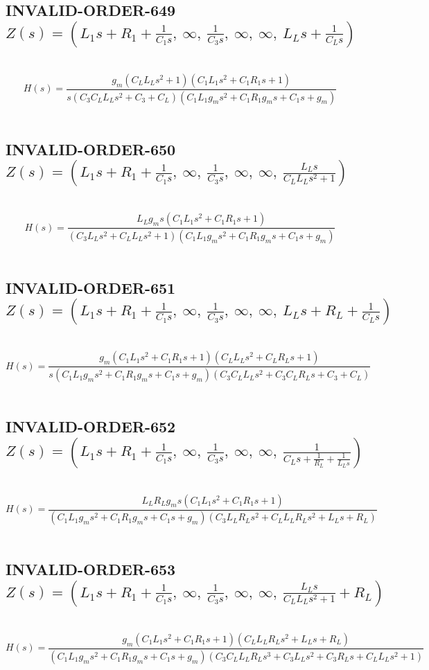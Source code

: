 \documentclass{article}
\begin{document}
\subsection{INVALID-ORDER-649 $Z(s) = \left( L_{1} s + R_{1} + \frac{1}{C_{1} s}, \  \infty, \  \frac{1}{C_{3} s}, \  \infty, \  \infty, \  L_{L} s + \frac{1}{C_{L} s}\right)$ } \ 
\textbf{\[H(s) = \frac{g_{m} \left(C_{L} L_{L} s^{2} + 1\right) \left(C_{1} L_{1} s^{2} + C_{1} R_{1} s + 1\right)}{s \left(C_{3} C_{L} L_{L} s^{2} + C_{3} + C_{L}\right) \left(C_{1} L_{1} g_{m} s^{2} + C_{1} R_{1} g_{m} s + C_{1} s + g_{m}\right)}\] } \ 
\subsection{INVALID-ORDER-650 $Z(s) = \left( L_{1} s + R_{1} + \frac{1}{C_{1} s}, \  \infty, \  \frac{1}{C_{3} s}, \  \infty, \  \infty, \  \frac{L_{L} s}{C_{L} L_{L} s^{2} + 1}\right)$ } \ 
\textbf{\[H(s) = \frac{L_{L} g_{m} s \left(C_{1} L_{1} s^{2} + C_{1} R_{1} s + 1\right)}{\left(C_{3} L_{L} s^{2} + C_{L} L_{L} s^{2} + 1\right) \left(C_{1} L_{1} g_{m} s^{2} + C_{1} R_{1} g_{m} s + C_{1} s + g_{m}\right)}\] } \ 
\subsection{INVALID-ORDER-651 $Z(s) = \left( L_{1} s + R_{1} + \frac{1}{C_{1} s}, \  \infty, \  \frac{1}{C_{3} s}, \  \infty, \  \infty, \  L_{L} s + R_{L} + \frac{1}{C_{L} s}\right)$ } \ 
\textbf{\[H(s) = \frac{g_{m} \left(C_{1} L_{1} s^{2} + C_{1} R_{1} s + 1\right) \left(C_{L} L_{L} s^{2} + C_{L} R_{L} s + 1\right)}{s \left(C_{1} L_{1} g_{m} s^{2} + C_{1} R_{1} g_{m} s + C_{1} s + g_{m}\right) \left(C_{3} C_{L} L_{L} s^{2} + C_{3} C_{L} R_{L} s + C_{3} + C_{L}\right)}\] } \ 
\subsection{INVALID-ORDER-652 $Z(s) = \left( L_{1} s + R_{1} + \frac{1}{C_{1} s}, \  \infty, \  \frac{1}{C_{3} s}, \  \infty, \  \infty, \  \frac{1}{C_{L} s + \frac{1}{R_{L}} + \frac{1}{L_{L} s}}\right)$ } \ 
\textbf{\[H(s) = \frac{L_{L} R_{L} g_{m} s \left(C_{1} L_{1} s^{2} + C_{1} R_{1} s + 1\right)}{\left(C_{1} L_{1} g_{m} s^{2} + C_{1} R_{1} g_{m} s + C_{1} s + g_{m}\right) \left(C_{3} L_{L} R_{L} s^{2} + C_{L} L_{L} R_{L} s^{2} + L_{L} s + R_{L}\right)}\] } \ 
\subsection{INVALID-ORDER-653 $Z(s) = \left( L_{1} s + R_{1} + \frac{1}{C_{1} s}, \  \infty, \  \frac{1}{C_{3} s}, \  \infty, \  \infty, \  \frac{L_{L} s}{C_{L} L_{L} s^{2} + 1} + R_{L}\right)$ } \ 
\textbf{\[H(s) = \frac{g_{m} \left(C_{1} L_{1} s^{2} + C_{1} R_{1} s + 1\right) \left(C_{L} L_{L} R_{L} s^{2} + L_{L} s + R_{L}\right)}{\left(C_{1} L_{1} g_{m} s^{2} + C_{1} R_{1} g_{m} s + C_{1} s + g_{m}\right) \left(C_{3} C_{L} L_{L} R_{L} s^{3} + C_{3} L_{L} s^{2} + C_{3} R_{L} s + C_{L} L_{L} s^{2} + 1\right)}\] } \ 
\end{document}
